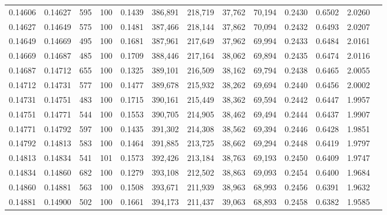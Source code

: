 \begin{tabular}{rrrrrrrrrrrrr}
0.14606 & 0.14627 &   595 & 100 &                                     0.1439 & 386,891 & 218,719 &  37,762 &  70,194 & 0.2430 & 0.6502 & 2.0260 \\
0.14627 & 0.14649 &   575 & 100 &                                     0.1481 & 387,466 & 218,144 &  37,862 &  70,094 & 0.2432 & 0.6493 & 2.0207 \\
0.14649 & 0.14669 &   495 & 100 &                                     0.1681 & 387,961 & 217,649 &  37,962 &  69,994 & 0.2433 & 0.6484 & 2.0161 \\
0.14669 & 0.14687 &   485 & 100 &                                     0.1709 & 388,446 & 217,164 &  38,062 &  69,894 & 0.2435 & 0.6474 & 2.0116 \\
0.14687 & 0.14712 &   655 & 100 &                                     0.1325 & 389,101 & 216,509 &  38,162 &  69,794 & 0.2438 & 0.6465 & 2.0055 \\
0.14712 & 0.14731 &   577 & 100 &                                     0.1477 & 389,678 & 215,932 &  38,262 &  69,694 & 0.2440 & 0.6456 & 2.0002 \\
0.14731 & 0.14751 &   483 & 100 &                                     0.1715 & 390,161 & 215,449 &  38,362 &  69,594 & 0.2442 & 0.6447 & 1.9957 \\
0.14751 & 0.14771 &   544 & 100 &                                     0.1553 & 390,705 & 214,905 &  38,462 &  69,494 & 0.2444 & 0.6437 & 1.9907 \\
0.14771 & 0.14792 &   597 & 100 &                                     0.1435 & 391,302 & 214,308 &  38,562 &  69,394 & 0.2446 & 0.6428 & 1.9851 \\
0.14792 & 0.14813 &   583 & 100 &                                     0.1464 & 391,885 & 213,725 &  38,662 &  69,294 & 0.2448 & 0.6419 & 1.9797 \\
0.14813 & 0.14834 &   541 & 101 &                                     0.1573 & 392,426 & 213,184 &  38,763 &  69,193 & 0.2450 & 0.6409 & 1.9747 \\
0.14834 & 0.14860 &   682 & 100 &                                     0.1279 & 393,108 & 212,502 &  38,863 &  69,093 & 0.2454 & 0.6400 & 1.9684 \\
0.14860 & 0.14881 &   563 & 100 &                                     0.1508 & 393,671 & 211,939 &  38,963 &  68,993 & 0.2456 & 0.6391 & 1.9632 \\
0.14881 & 0.14900 &   502 & 100 &                                     0.1661 & 394,173 & 211,437 &  39,063 &  68,893 & 0.2458 & 0.6382 & 1.9585 \\

\end{tabular}
